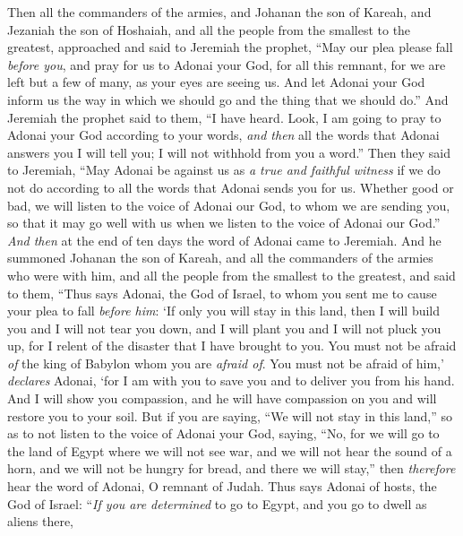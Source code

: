\begin{biblechapter} %
 Then all the commanders of the armies, and Johanan the son of Kareah, and Jezaniah the son of Hoshaiah, and all the people from the smallest to the greatest, approached
\verse and said to Jeremiah the prophet, “May our plea please fall \textit{before you}, and pray for us to Adonai your God, for all this remnant, for we are left but a few of many, as your eyes are seeing us.
\verse And let Adonai your God inform us the way in which we should go and the thing that we should do.”
\verse And Jeremiah the prophet said to them, “I have heard. Look, I am going to pray to Adonai your God according to your words, \textit{and then} all the words that Adonai answers you I will tell you; I will not withhold from you a word.”
\verse Then they said to Jeremiah, “May Adonai be against us as \textit{a true and faithful witness} if we do not do according to all the words that Adonai sends you for us.
\verse Whether good or bad, we will listen to the voice of Adonai our God, to whom we are sending you, so that it may go well with us when we listen to the voice of Adonai our God.”
 \textit{And then} at the end of ten days the word of Adonai came to Jeremiah.
\verse And he summoned Johanan the son of Kareah, and all the commanders of the armies who were with him, and all the people from the smallest to the greatest,
\verse and said to them, “Thus says Adonai, the God of Israel, to whom you sent me to cause your plea to fall \textit{before him}:
\verse ‘If only you will stay in this land, then I will build you and I will not tear you down, and I will plant you and I will not pluck you up, for I relent of the disaster that I have brought to you.
\verse You must not be afraid \textit{of} the king of Babylon whom you are \textit{afraid of}. You must not be afraid of him,’ \textit{declares} Adonai, ‘for I am with you to save you and to deliver you from his hand.
\verse And I will show you compassion, and he will have compassion on you and will restore you to your soil.
\verse But if you are saying, “We will not stay in this land,” so as to not listen to the voice of Adonai your God,
\verse saying, “No, for we will go to the land of Egypt where we will not see war, and we will not hear the sound of a horn, and we will not be hungry for bread, and there we will stay,”
\verse then \textit{therefore} hear the word of Adonai, O remnant of Judah. Thus says Adonai of hosts, the God of Israel: “\textit{If you are determined} to go to Egypt, and you go to dwell as aliens there,

\end{biblechapter}
